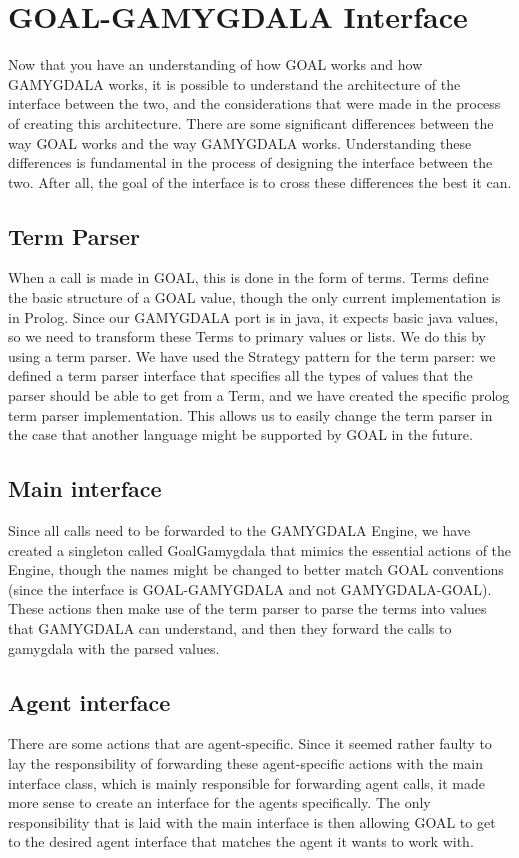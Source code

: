 \section{GOAL-GAMYGDALA Interface}
Now that you have an understanding of how GOAL works and how GAMYGDALA works, it is possible to understand the architecture of the interface between the two, and the considerations that were made in the process of creating this architecture.
There are some significant differences between the way GOAL works and the way GAMYGDALA works. Understanding these differences is fundamental in the process of designing the interface between the two. After all, the goal of the interface is to cross these differences the best it can.

\subsection{Term Parser}
When a call is made in GOAL, this is done in the form of terms. Terms define the basic structure of a GOAL value, though the only current implementation is in Prolog. Since our GAMYGDALA port is in java, it expects basic java values, so we need to transform these Terms to primary values or lists. We do this by using a term parser.
We have used the Strategy pattern for the term parser: we defined a term parser interface that specifies all the types of values that the parser should be able to get from a Term, and we have created the specific prolog term parser implementation. This allows us to easily change the term parser in the case that another language might be supported by GOAL in the future.

\subsection{Main interface}
Since all calls need to be forwarded to the GAMYGDALA Engine, we have created a singleton called GoalGamygdala that mimics the essential actions of the Engine, though the names might be changed to better match GOAL conventions (since the interface is GOAL-GAMYGDALA and not GAMYGDALA-GOAL). These actions then make use of the term parser to parse the terms into values that GAMYGDALA can understand, and then they forward the calls to gamygdala with the parsed values.

\subsection{Agent interface}
There are some actions that are agent-specific. Since it seemed rather faulty to lay the responsibility of forwarding these agent-specific actions with the main interface class, which is mainly responsible for forwarding agent calls, it made more sense to create an interface for the agents specifically. The only responsibility that is laid with the main interface is then allowing GOAL to get to the desired agent interface that matches the agent it wants to work with.

